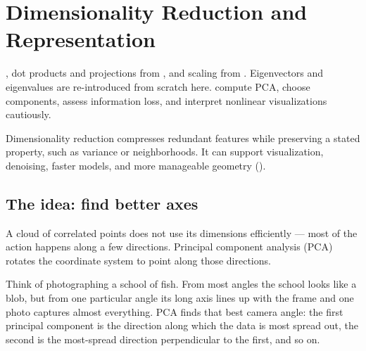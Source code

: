 \chapter{Dimensionality Reduction and Representation}
\label{ch:dimred}

\chapterguide%
  {, dot products and projections from , and scaling from . Eigenvectors and eigenvalues are re-introduced from scratch here.}
  {compute PCA, choose components, assess information loss, and interpret nonlinear visualizations cautiously.}

Dimensionality reduction compresses redundant features while preserving a stated property, such as variance or neighborhoods. It can support visualization, denoising, faster models, and more manageable geometry ().

\section{The idea: find better axes}

A cloud of correlated points does not use its dimensions efficiently --- most of the action happens along a few directions. Principal component analysis (PCA) rotates the coordinate system to point along those directions.

\begin{mlfigure}
\end{mlfigure}

\begin{intuition}
Think of photographing a school of fish. From most angles the school looks like a blob, but from one particular angle its long axis lines up with the frame and one photo captures almost everything. PCA finds that best camera angle: the first principal component is the direction along which the data is most spread out, the second is the most-spread direction perpendicular to the first, and so on.
\end{intuition}

